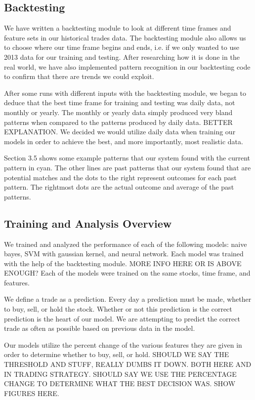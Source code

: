 \documentclass{article}
\begin{document}
\subsection{Backtesting}

We have written a backtesting module to look at different time frames and feature sets in our historical trades data. The backtesting module also allows us to choose where our time frame begins and ends, i.e. if we only wanted to use 2013 data for our training and testing. After researching how it is done in the real world, we have also implemented pattern recognition in our backtesting code to confirm that there are trends we could exploit.

After some runs with different inputs with the backtesting module, we began to deduce that the best time frame for training and testing was daily data, not monthly or yearly. The monthly or yearly data simply produced very bland patterns when compared to the patterns produced by daily data. BETTER EXPLANATION. We decided we would utilize daily data when training our models in order to achieve the best, and more importantly, most realistic data.

Section 3.5 shows some example patterns that our system found with the current pattern in cyan.   The other lines are past patterns that our system found that are potential matches and the dots to the right represent outcomes for each past pattern.  The rightmost dots are the actual outcome and average of the past patterns.

\subsection{Training and Analysis Overview}
We trained and analyzed the performance of each of the following models: naive bayes, SVM with gaussian kernel, and neural network. Each model was trained with the help of the backtesting module. MORE INFO HERE OR IS ABOVE ENOUGH? Each of the models were trained on the same stocks, time frame, and features.

We define a trade as a prediction. Every day a prediction must be made, whether to buy, sell, or hold the stock. Whether or not this prediction is the correct prediction is the heart of our model. We are attempting to predict the correct trade as often as possible based on previous data in the model.

Our models utilize the percent change of the various features they are given in order to determine whether to buy, sell, or hold. SHOULD WE SAY THE THRESHOLD AND STUFF, REALLY DUMBS IT DOWN. BOTH HERE AND IN TRADING STRATEGY. SHOULD SAY WE USE THE PERCENTAGE CHANGE TO DETERMINE WHAT THE BEST DECISION WAS. SHOW FIGURES HERE.
\end{document}
